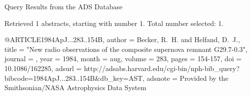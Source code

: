 Query Results from the ADS Database


Retrieved 1 abstracts, starting with number 1.  Total number selected: 1.

@ARTICLE{1984ApJ...283..154B,
   author = {{Becker}, R.~H. and {Helfand}, D.~J.},
    title = "{New radio observations of the composite supernova remnant G29.7-0.3}",
  journal = {\apj},
     year = 1984,
    month = aug,
   volume = 283,
    pages = {154-157},
      doi = {10.1086/162285},
   adsurl = {http://adsabs.harvard.edu/cgi-bin/nph-bib_query?bibcode=1984ApJ...283..154B&db_key=AST},
  adsnote = {Provided by the Smithsonian/NASA Astrophysics Data System}
}


